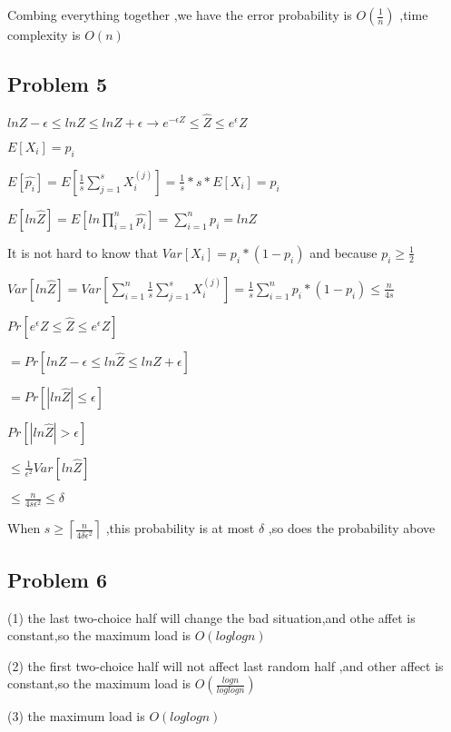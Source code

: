 \documentclass[]{article}
\begin{document}
Combing everything together ,we have the error probability is
\(O(\frac{1}{n})\) ,time complexity is \(O(n)\)

\hypertarget{header-n87}{%
\subsection{Problem 5}\label{header-n87}}

\(lnZ -\epsilon \leq ln\widehat{Z} \leq lnZ + \epsilon \longrightarrow e^{- \epsilon Z} \leq \widehat{Z} \leq e^{\epsilon}Z \)

\( E[X_{i}] = p_{i} \)

\( E[\hat{p_{i}}]=E[\frac{1}{s} \sum_{j=1}^{s}X_{i}^{(j)}]= \frac{1}{s}*s*E[X_{i}] = p_{i} \)

\( E[ln\widehat{Z}] = E[ln \prod_{i=1}^{n}\hat{p_{i}}]= \sum_{i=1}^{n}p_{i}=lnZ \)

It is not hard to know that \( Var[X_{i}]= p_{i}*(1-p_{i})\) and because
\(p_{i} \geq \frac{1}{2}\)

\(Var[ln\widehat{Z}]=Var[\sum_{i=1}^{n}\frac{1}{s} \sum_{j=1}^{s}X_{i}^{(j)}]= \frac{1}{s}\sum_{i=1}^{n}p_{i}*(1-p_{i})\leq \frac{n}{4s} \)

\( Pr[e^{\epsilon}Z \leq \widehat{Z} \leq e^{\epsilon}Z] \)

\(= Pr[lnZ - \epsilon \leq ln\widehat{Z} \leq lnZ+ \epsilon] \)

\( = Pr[|ln\widehat{Z}| \leq \epsilon] \)

\(Pr[|ln\widehat{Z}|>\epsilon]\)

\(\leq \frac{1}{\epsilon^{2}}Var[ln\widehat{Z}]\)

\(\leq \frac{n}{4s\epsilon^{2}}\leq \delta\)

When \( s\geq\left\lceil\frac{n}{4\delta\epsilon^{2}}\right\rceil \)
,this probability is at most \(\delta\) ,so does the probability above

\hypertarget{header-n104}{%
\subsection{Problem 6}\label{header-n104}}

(1) the last two-choice half will change the bad situation,and othe
affet is constant,so the maximum load is \(O(loglogn)\)

(2) the first two-choice half will not affect last random half ,and
other affect is constant,so the maximum load is
\(O(\frac{logn}{loglogn})\)

(3) the maximum load is \(O(loglogn)\)
\end{document}
